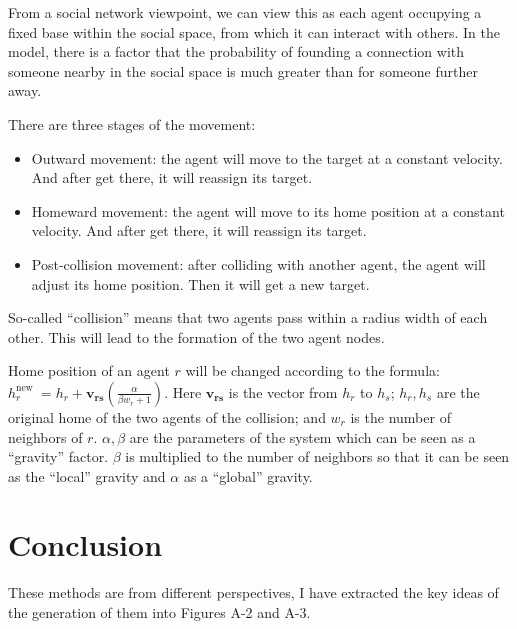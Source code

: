 \begin{survey}
From a social network viewpoint, we can view this as each agent
occupying a fixed base within the social space, from which it can
interact with others. In the model, there is a factor that the
probability of founding a connection with someone nearby in the social
space is much greater than for someone further away.

There are three stages of the movement:

\begin{itemize}
\item
  Outward movement: the agent will move to the target at a constant
  velocity. And after get there, it will reassign its target.
\item
  Homeward movement: the agent will move to its home position at a
  constant velocity. And after get there, it will reassign its target.
\item
  Post-collision movement: after colliding with another agent, the agent
  will adjust its home position. Then it will get a new target.
\end{itemize}

\vspace{0.2cm}

So-called “collision” means that two agents pass within a radius width
of each other. This will lead to the formation of the two agent nodes.

Home position of an agent \(r\) will be changed according to the
formula:
\(h_{r}^{\text {new }}=h_{r}+\boldsymbol{v}_{\boldsymbol{r s}}\left(\frac{\alpha}{\beta w_{r}+1}\right)\).
Here \(\boldsymbol{v}_{\boldsymbol{r s}}\) is the vector from \(h_r\) to
\(h_s\); \(h_r, h_s\) are the original home of the two agents of the
collision; and \(w_r\) is the number of neighbors of \(r\).
\(\alpha, \beta\) are the parameters of the system which can be seen as
a “gravity” factor. \(\beta\) is multiplied to the number of neighbors
so that it can be seen as the “local” gravity and \(\alpha\) as a
“global” gravity.

\section{Conclusion}


These methods are from different perspectives, I have extracted the key
ideas of the generation of them into Figures A-2 and A-3.


\end{survey}
